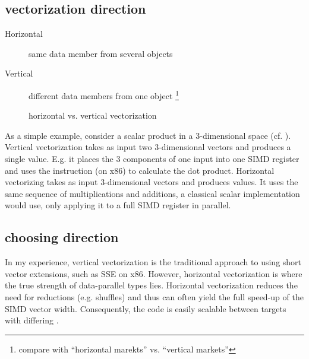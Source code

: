 \subsection{vectorization direction}
  \begin{description}
    \item[Horizontal] same data member from several objects
    \item[Vertical] different data members from one object
      \footnote{compare with “horizontal marekts” vs. “vertical markets”}
  \end{description}

  \begin{figure}
    \centering
    \caption{horizontal vs. vertical vectorization}
    \label{fig:vectorization direction}
  \end{figure}

  As a simple example, consider a scalar product in a 3-dimensional space (cf. ).
  Vertical vectorization takes as input two 3-dimensional vectors and produces a single value.
  E.g. it places the 3 components of one input into one SIMD register and uses the  instruction (on x86) to calculate the dot product.
  Horizontal vectorizing takes as input  3-dimensional vectors and produces  values.
  It uses the same sequence of multiplications and additions, a classical scalar implementation would use, only applying it to a full SIMD register in parallel.

\subsection{choosing direction}
  In my experience, vertical vectorization is the traditional approach to using short vector extensions, such as SSE on x86.
  However, horizontal vectorization is where the true strength of data-parallel types lies.
  Horizontal vectorization reduces the need for reductions (e.g. shuffles) and thus can often yield the full speed-up of the SIMD vector width.
  Consequently, the code is easily scalable between targets with differing .

